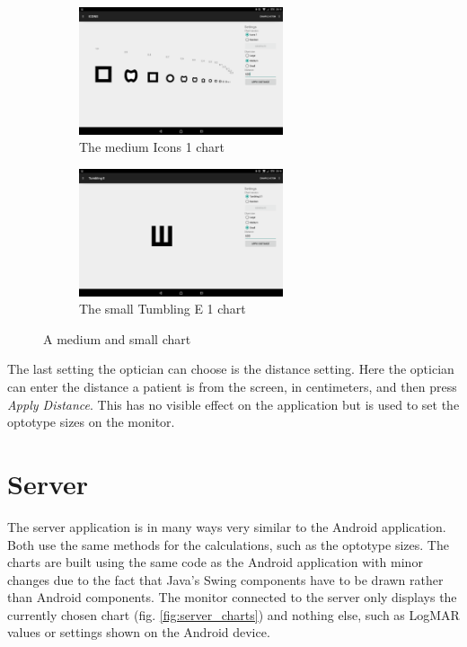 \documentclass[12pt,a4paper,notitlepage]{report}
\begin{document}
\begin{figure}[ht!]
\centering
\begin{subfigure}{.5\textwidth}
  \centering
  \includegraphics[width=60mm]{images/appgui/icons_medium.png}
  \caption{The medium Icons 1 chart}
  \label{fig:icons_medium}
\end{subfigure}%
\begin{subfigure}{.5\textwidth}
  \centering
  \includegraphics[width=60mm]{images/appgui/tumbling_e_small.png}
  \caption{The small Tumbling E 1 chart}
  \label{fig:tumbling_e_small}
\end{subfigure}
\caption{A medium and small chart}
\label{fig:chart_medium_small}
\end{figure}

The last setting the optician can choose is the distance setting. Here the optician can enter the distance a patient is from the screen, in centimeters, and then press \textit{Apply Distance}. This has no visible effect on the application but is used to set the optotype sizes on the monitor.

\section{Server}
The server application is in many ways very similar to the Android application. Both use the same methods for the calculations, such as the optotype sizes. The charts are built using the same code as the Android application with minor changes due to the fact that Java's Swing components have to be drawn rather than Android components. The monitor connected to the server only displays the currently chosen chart (fig. \ref{fig:server_charts}) and nothing else, such as LogMAR values or settings shown on the Android device.
\end{document}
